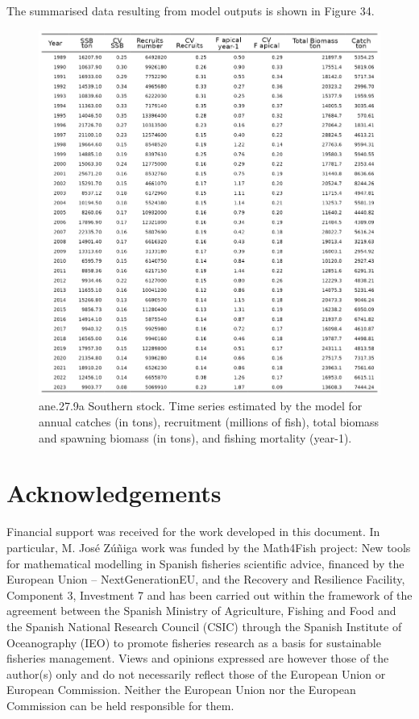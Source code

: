 \documentclass[
]{article}
\begin{document}
The summarised data resulting from model outputs is shown in Figure 34.

\begin{figure}[H]

{\centering \includegraphics[width=0.95\linewidth]{report/run/S1.0_4FLEETS_SelECO_RecIndex_Mnewfix/tb_timeseries} 

}

\caption{ane.27.9a Southern stock. Time series estimated by the model for annual catches (in tons), recruitment (millions of fish), total biomass and spawning biomass (in tons), and fishing mortality (year-1).}\label{fig:unnamed-chunk-40}
\end{figure}

\hypertarget{acknowledgements}{%
\section{Acknowledgements}\label{acknowledgements}}

Financial support was received for the work developed in this document.
In particular, M. José Zúñiga work was funded by the Math4Fish project:
New tools for mathematical modelling in Spanish fisheries scientific
advice, financed by the European Union -- NextGenerationEU, and the
Recovery and Resilience Facility, Component 3, Investment 7 and has been
carried out within the framework of the agreement between the Spanish
Ministry of Agriculture, Fishing and Food and the Spanish National
Research Council (CSIC) through the Spanish Institute of Oceanography
(IEO) to promote fisheries research as a basis for sustainable fisheries
management. Views and opinions expressed are however those of the
author(s) only and do not necessarily reflect those of the European
Union or European Commission. Neither the European Union nor the
European Commission can be held responsible for them.
\end{document}

